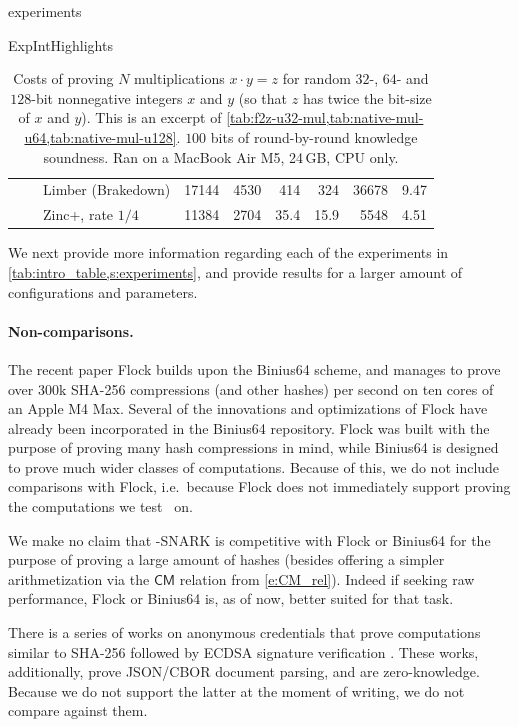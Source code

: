 \begin{lncsappendix}{experiments}
\begin{lncstable}{ExpIntHighlights}
\begin{table}[H]
\begin{tabular}{@{}rrlrrrrrr@{}}
     &  & Limber (Brakedown) & 17144 & 4530 & 414 & 324 & 36678 & 9.47 \\
     &  & Zinc+, rate $1/4$ & 11384 & 2704 & 35.4 & 15.9 & 5548 & 4.51 \\
    \bottomrule
  \end{tabular}
  \caption{Costs of proving $N$ multiplications $x\cdot y = z$ for random $32$-, $64$- and $128$-bit nonnegative integers $x$ and $y$ (so that $z$ has twice the bit-size of $x$ and $y$). This is an excerpt of \cref{tab:f2z-u32-mul,tab:native-mul-u64,tab:native-mul-u128}. $100$ bits of round-by-round knowledge soundness.  Ran on a MacBook Air M5, 24\,GB, CPU only.}
  \label{tab:int_highlights}
\end{table}
\end{lncstable}



\iflncs We next provide more information regarding each of the  experiments  in \cref{tab:intro_table,s:experiments}, and provide results for a larger amount of configurations and parameters.  \else\fi



\paragraph{Non-comparisons.} The recent paper Flock \cite{flock} builds upon the Binius64 scheme, and manages  to prove over 300k SHA-256 compressions (and other hashes) per second on ten cores of an Apple M4 Max. Several of the innovations and optimizations of Flock have already been incorporated in the Binius64 repository. Flock was built with the purpose of proving many hash compressions in mind, while Binius64 is  designed to prove much wider classes of computations. Because of this, we do not include comparisons with Flock, i.e.\ because Flock does not immediately support proving the computations we test \ftwoz\ on. 

We make no claim that \ftwoz-SNARK is competitive with Flock or Binius64 for the purpose of proving a large amount of hashes (besides offering a simpler arithmetization via the $\mathsf{CM}$ relation from \cref{e:CM_rel}). Indeed if seeking raw performance, Flock or Binius64 is, as of now, better suited for that task.


 There is a series of works  on anonymous credentials that prove computations similar to SHA-256 followed by ECDSA signature verification \cite{longfellow,vega}. These works, additionally, prove JSON/CBOR document parsing, and are zero-knowledge. Because we do not support the latter at the moment of writing, we do not compare against them.


\end{lncsappendix}
